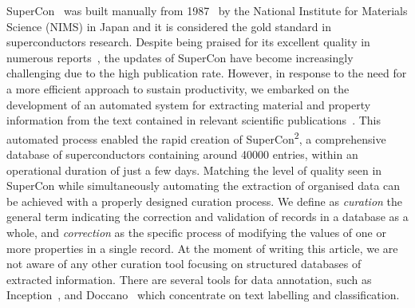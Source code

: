 \documentclass[a4paper]{article}
\begin{document}

SuperCon~\cite{SuperCon} was built manually from 1987~\cite{ishii2023structuring} by the National Institute for Materials Science (NIMS) in Japan and it is considered the gold standard in superconductors research.
Despite being praised for its excellent quality in numerous reports~\cite{roter2020predicting, stanev_machine_2017, tran2022machine, konno2021deep}, the updates of SuperCon have become increasingly challenging due to the high publication rate. 
However, in response to the need for a more efficient approach to sustain productivity, we embarked on the development of an automated system for extracting material and property information from the text contained in relevant scientific publications~\cite{lfoppiano2023automatic}. 
This automated process enabled the rapid creation of SuperCon\textsuperscript{2}, a comprehensive database of superconductors containing around 40000 entries, within an operational duration of just a few days. 
Matching the level of quality seen in SuperCon while simultaneously automating the extraction of organised data can be achieved with a properly designed curation process. 
We define as \emph{curation} the general term indicating the correction and validation of records in a database as a whole, and \emph{correction} as the specific process of modifying the values of one or more properties in a single record. 
At the moment of writing this article, we are not aware of any other curation tool focusing on structured databases of extracted information. 
There are several tools for data annotation, such as Inception~\cite{klie-etal-2018-inception}, and Doccano~\cite{doccano} which concentrate on text labelling and classification.
\end{document}
